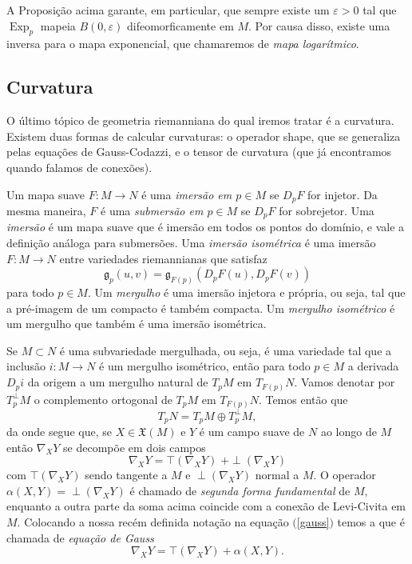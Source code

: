 \documentclass{article}
\DeclareMathOperator{\Exp}{Exp}
\begin{document}
A Proposição acima garante, em particular, que sempre existe um $\varepsilon > 0$ tal que $\Exp_p$ mapeia $B(0, \varepsilon)$ difeomorficamente em $M$. Por causa disso, existe uma inversa para o mapa exponencial, que chamaremos de \textit{mapa logarítmico}.

\subsection{Curvatura}

O último tópico de geometria riemanniana do qual iremos tratar é a curvatura. Existem duas formas de calcular curvaturas: o operador shape, que se generaliza pelas equações de Gauss-Codazzi, e o tensor de curvatura (que já encontramos quando falamos de conexões).

Um mapa suave $F \colon M \to N$ é uma \textit{imersão em $p \in M$} se $D_pF$ for injetor. Da mesma maneira, $F$ é uma \textit{submersão em $p \in M$} se $D_pF$ for sobrejetor. Uma \textit{imersão} é um mapa suave que é imersão em todos os pontos do domínio, e vale a definição análoga para submersões. Uma \textit{imersão isométrica} é uma imersão $F \colon M \to N$ entre variedades riemannianas que satisfaz \begin{equation}
    \mathfrak{g}_p(u, v) = \mathfrak{g}_{F(p)}(D_pF(u), D_pF(v))
\end{equation} para todo $p \in M$. Um \textit{mergulho} é uma imersão injetora e própria, ou seja, tal que a pré-imagem de um compacto é também compacta. Um \textit{mergulho isométrico} é um mergulho que também é uma imersão isométrica.

Se $M \subset N$ é uma subvariedade mergulhada, ou seja, é uma variedade tal que a inclusão $i \colon M \to N$ é um mergulho isométrico, então para todo $p \in M$ a derivada $D_pi$ da origem a um mergulho natural de $T_pM$ em $T_{F(p)}N$. Vamos denotar por $T^\perp_pM$ o complemento ortogonal de $T_pM$ em $T_{F(p)}N$. Temos então que \begin{equation}
    T_pN = T_pM \oplus T_p^\perp M,
\end{equation} da onde segue que, se $X \in \mathfrak{X}(M)$ e $Y$ é um campo suave de $N$ ao longo de $M$ então $\nabla_X Y$ se decompõe em dois campos \begin{equation}\label{gauss}
    \nabla_X Y = \top(\nabla_X Y)\phantom{.}+ \perp(\nabla_X Y)
\end{equation} com $\top(\nabla_X Y)$ sendo tangente a $M$ e $\perp(\nabla_X Y)$ normal a $M$. O operador $\alpha(X, Y) = \perp(\nabla_X Y)$ é chamado de \textit{segunda forma fundamental} de $M$, enquanto a outra parte da soma acima coincide com a conexão de Levi-Civita em $M$. Colocando a nossa recém definida notação na equação $($\ref{gauss}$)$ temos a que é chamada de \textit{equação de Gauss} \begin{equation}
    \nabla_X Y = \top(\nabla_X Y) + \alpha(X, Y).
\end{equation}
\end{document}
